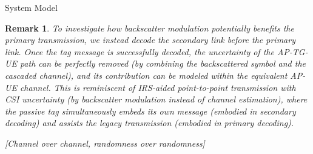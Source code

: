 \documentclass[journal]{IEEEtran}
\newtheorem{remark}{Remark}
\begin{document}
\begin{section}{System Model}
		\begin{remark}
			To investigate how backscatter modulation potentially benefits the primary transmission, we instead decode the secondary link before the primary link. Once the tag message is successfully decoded, the uncertainty of the AP-TG-UE path can be perfectly removed (by combining the backscattered symbol and the cascaded channel), and its contribution can be modeled within the equivalent AP-UE channel. This is reminiscent of IRS-aided point-to-point transmission with CSI uncertainty (by backscatter modulation instead of channel estimation), where the passive tag simultaneously embeds its own message (embodied in secondary decoding) and assists the legacy transmission (embodied in primary decoding).

			[Channel over channel, randomness over randomness]
		\end{remark}


\end{section}
\end{document}
